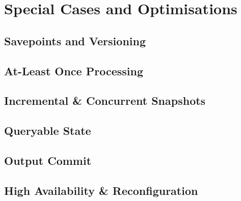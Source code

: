 
\section{Special Cases and Optimisations}

\subsection{Savepoints and Versioning}

\subsection{At-Least Once Processing}

\subsection{Incremental \& Concurrent Snapshots}

\subsection{Queryable State}

\subsection{Output Commit}

\subsection{High Availability \& Reconfiguration}
